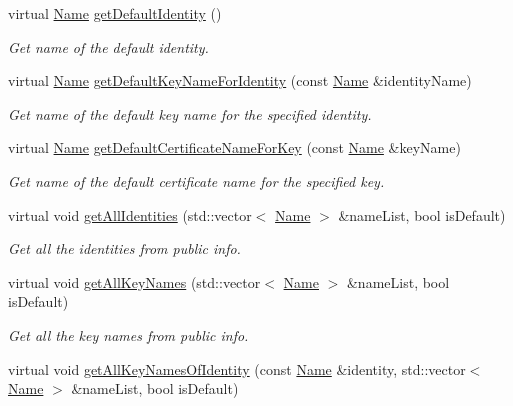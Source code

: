 \begin{DoxyCompactItemize}
virtual \hyperlink{classndn_1_1Name}{Name} \hyperlink{classndn_1_1security_1_1DummyPublicInfo_ad2672ed3e619c57336bc15e9061d850c}{get\+Default\+Identity} ()
\begin{DoxyCompactList}\small\item\em Get name of the default identity. \end{DoxyCompactList}\item 
virtual \hyperlink{classndn_1_1Name}{Name} \hyperlink{classndn_1_1security_1_1DummyPublicInfo_ae1c3d37cd1d5a94a81196be6b2f480fd}{get\+Default\+Key\+Name\+For\+Identity} (const \hyperlink{classndn_1_1Name}{Name} \&identity\+Name)
\begin{DoxyCompactList}\small\item\em Get name of the default key name for the specified identity. \end{DoxyCompactList}\item 
virtual \hyperlink{classndn_1_1Name}{Name} \hyperlink{classndn_1_1security_1_1DummyPublicInfo_acb9e9940cc3a233ea09edb427541a923}{get\+Default\+Certificate\+Name\+For\+Key} (const \hyperlink{classndn_1_1Name}{Name} \&key\+Name)
\begin{DoxyCompactList}\small\item\em Get name of the default certificate name for the specified key. \end{DoxyCompactList}\item 
virtual void \hyperlink{classndn_1_1security_1_1DummyPublicInfo_ac87cafd66c445313c68a9e826661de3e}{get\+All\+Identities} (std\+::vector$<$ \hyperlink{classndn_1_1Name}{Name} $>$ \&name\+List, bool is\+Default)
\begin{DoxyCompactList}\small\item\em Get all the identities from public info. \end{DoxyCompactList}\item 
virtual void \hyperlink{classndn_1_1security_1_1DummyPublicInfo_aaf2e6a585fe44fe9bd29c05482b7751c}{get\+All\+Key\+Names} (std\+::vector$<$ \hyperlink{classndn_1_1Name}{Name} $>$ \&name\+List, bool is\+Default)
\begin{DoxyCompactList}\small\item\em Get all the key names from public info. \end{DoxyCompactList}\item 
virtual void \hyperlink{classndn_1_1security_1_1DummyPublicInfo_a2e0afb6dc2ce1d127b9170873ad32225}{get\+All\+Key\+Names\+Of\+Identity} (const \hyperlink{classndn_1_1Name}{Name} \&identity, std\+::vector$<$ \hyperlink{classndn_1_1Name}{Name} $>$ \&name\+List, bool is\+Default)

\end{DoxyCompactItemize}
